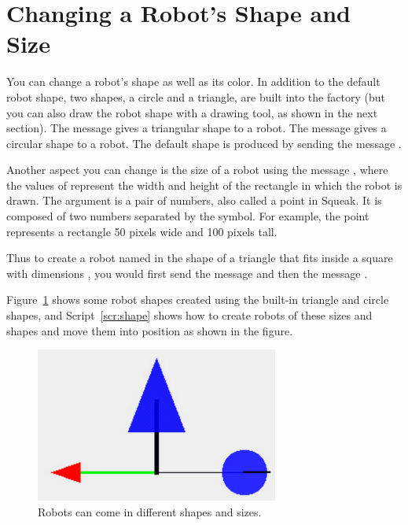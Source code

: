 \documentclass[a4paper,10pt,twoside]{book}
\begin{document}
\section{Changing a Robot’s Shape and Size}

You can change a robot’s shape as well as its color. In addition to the default robot shape, two 
shapes, a circle and a triangle, are built into the  factory (but you can also draw the robot 
shape with a drawing tool, as shown in the next section). The message  gives 
a triangular shape to a robot. The message  gives a circular shape to a robot. 
The default shape is produced by sending the message . 

Another aspect you can change is the size of a robot using the message , 
where the values of  represent the width and height of the 
rectangle in which the robot is drawn. The argument  is a pair of numbers, 
also called a point in Squeak. It is composed of two numbers separated by the  symbol. 
For example, the point  represents a rectangle 50 pixels wide and 100 pixels tall. 

Thus to create a robot named  in the shape of a triangle that fits inside a square 
with dimensions , you would first send  the message  and 
then the message . 

Figure~\ref{fig:shapeAndSize} shows some robot shapes created using the built-in triangle and circle shapes, 
and Script~\ref{scr:shape} shows how to create robots of these sizes and shapes and move them into 
position as shown in the figure. 


\begin{figure}[h]
\begin{center}
\includegraphics[width=8cm]{shapeAndSize}
\caption{Robots can come in different shapes and sizes. \label{fig:shapeAndSize}}
\end{center}
\end{figure}
\end{document}
